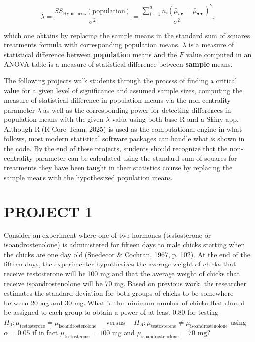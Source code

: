 \documentclass[
]{article}
\begin{document}
\begin{equation*}
\lambda = \frac{SS_\text{Hypothesis}(\text{population})}{\sigma^2} = \frac{\sum_{i=1}^{a}n_i(\bar{\mu}_{i\bullet} - \bar{\mu}_{\bullet\bullet})^2}{\sigma^2},
\end{equation*}

which one obtains by replacing the sample means in the standard sum of squares treatments formula with corresponding population means. \(\lambda\) is a measure of statistical difference between \textbf{population} means and the \(F\) value computed in an ANOVA table is a measure of statistical difference between \textbf{sample} means.

The following projects walk students through the process of finding a critical value for a given level of significance and assumed sample sizes, computing the measure of statistical difference in population means via the non-centrality parameter \(\lambda\) as well as the corresponding power for detecting differences in population means with the given \(\lambda\) value using both base R and a Shiny app. Although R (R Core Team, 2025) is used as the computational engine in what follows, most modern statistical software packages can handle what is shown in the code. By the end of these projects, students should recognize that the non-centrality parameter can be calculated using the standard sum of squares for treatments they have been taught in their statistics course by replacing the sample means with the hypothesized population means.

\hypertarget{project-1}{%
\section*{PROJECT 1}\label{project-1}}

Consider an experiment where one of two hormones (testosterone or isoandrostenolone) is administered for fifteen days to male chicks starting when the chicks are one day old (Snedecor \& Cochran, 1967, p. 102). At the end of the fifteen days, the experimenter hypothesizes the average weight of chicks that receive testosterone will be 100 mg and that the average weight of chicks that receive isoandrostenolone will be 70 mg. Based on previous work, the researcher estimates the standard deviation for both groups of chicks to be somewhere between 20 mg and 30 mg. What is the minimum number of chicks that should be assigned to each group to obtain a power of at least 0.80 for testing \(H_0: \mu_\text{testosterone} = \mu_\text{isoandrostenolone}\quad\text{ versus }\quad H_A: \mu_\text{testosterone} \neq \mu_\text{isoandrostenolone}\) using \(\alpha = 0.05\) if in fact \(\mu_\text{testosterone} = 100\) mg and \(\mu_\text{isoandrostenolone} = 70\) mg?
\end{document}
